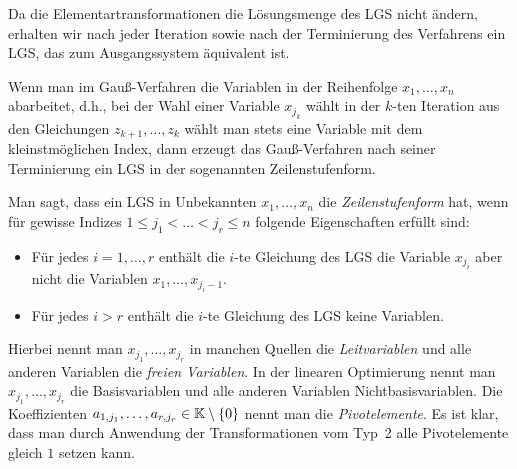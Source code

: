 \begin{appendices}
\begin{framed}
	Da die Elementartransformationen die Lösungsmenge des LGS nicht ändern, erhalten wir nach jeder Iteration sowie nach der Terminierung des Verfahrens ein LGS, das zum Ausgangssystem äquivalent ist. 
	\end{framed}

Wenn man im Gauß-Verfahren die Variablen in der Reihenfolge $x_1,\ldots,x_n$ abarbeitet, d.h., bei der Wahl einer Variable $x_{j_k}$ wählt in der $k$-ten Iteration aus den Gleichungen $z_{k+1},\ldots,z_k$ wählt man stets eine Variable mit dem kleinstmöglichen Index, dann erzeugt das Gauß-Verfahren nach seiner Terminierung ein LGS in der sogenannten Zeilenstufenform. 

Man sagt, dass ein LGS  in Unbekannten $x_1,\ldots,x_n$ die \emph{Zeilenstufenform} hat, wenn für gewisse Indizes $1 \le j_1 < \ldots < j_r \le n$ folgende Eigenschaften erfüllt sind: 
\begin{itemize}
	\item Für jedes $i=1,\ldots,r$ enthält die $i$-te Gleichung des LGS die Variable $x_{j_i}$ aber nicht die Variablen $x_1,\ldots,x_{j_i-1}$. 
	\item Für jedes $i>r$ enthält die $i$-te Gleichung des LGS keine Variablen. 
\end{itemize}

Hierbei nennt man $x_{j_1},\ldots,x_{j_r}$ in manchen Quellen die \emph{Leitvariablen} und alle anderen Variablen die \emph{freien Variablen}. In der linearen Optimierung nennt man $x_{j_1},\ldots,x_{j_r}$ die Basisvariablen und alle anderen Variablen Nichtbasisvariablen. Die Koeffizienten $a_{1,j_1},\ldots,a_{r,j_r} \in \mathbb K \setminus \{0\}$ nennt man die \emph{Pivotelemente}. Es ist klar, dass man durch Anwendung der Transformationen vom Typ~2 alle Pivotelemente gleich $1$ setzen kann. 


\end{appendices}
